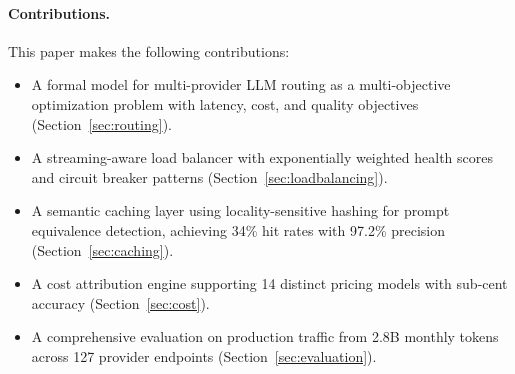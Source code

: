 \paragraph{Contributions.} This paper makes the following contributions:
\begin{itemize}[leftmargin=*]
    \item A formal model for multi-provider LLM routing as a multi-objective optimization problem with latency, cost, and quality objectives (Section~\ref{sec:routing}).
    \item A streaming-aware load balancer with exponentially weighted health scores and circuit breaker patterns (Section~\ref{sec:loadbalancing}).
    \item A semantic caching layer using locality-sensitive hashing for prompt equivalence detection, achieving 34\% hit rates with 97.2\% precision (Section~\ref{sec:caching}).
    \item A cost attribution engine supporting 14 distinct pricing models with sub-cent accuracy (Section~\ref{sec:cost}).
    \item A comprehensive evaluation on production traffic from 2.8B monthly tokens across 127 provider endpoints (Section~\ref{sec:evaluation}).
\end{itemize}

